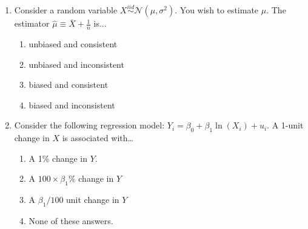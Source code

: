 \documentclass{article}
\begin{document}
\begin{enumerate}
\item Consider a random variable $X\stackrel{iid}{\sim}\mathcal{N}(\mu, \sigma^2)$. You wish to estimate $\mu$. The estimator $\hat{\mu}\equiv \overline{X} + \frac{1}{n} $ is...

\begin{enumerate}[label=\alph*)]
\item unbiased and consistent
\item unbiased and inconsistent
\item biased and consistent
\item biased and inconsistent
\end{enumerate}\vspace{.25cm}

\item Consider the following regression model: $Y_i = \beta_0 + \beta_1 \ln(X_i) + u_i$. A 1-unit change in $X$ is associated with…
\begin{enumerate}[label=\alph*)]
        \item A 1\% change in $Y$.
        \item A $100 \times \beta_1 \%$ change in $Y$
        \item A $\beta_1/100$ unit change in $Y$
        \item None of these answers.
\end{enumerate}\vspace{.25cm}


\end{enumerate}


\newpage
{}\\[2em]
\end{document}
